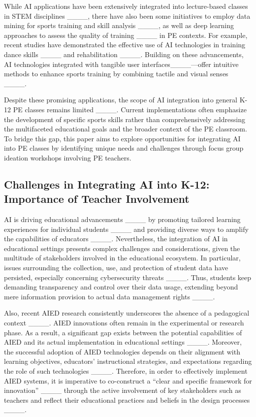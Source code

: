 While AI applications have been extensively integrated into lecture-based classes in STEM disciplines ____, there have also been some initiatives to employ data mining for sports training and skill analysis ____, as well as deep learning approaches to assess the quality of training ____ in PE contexts. For example, recent studies have demonstrated the effective use of AI technologies in training dance skills ____ and rehabilitation ____. Building on these advancements, AI technologies integrated with tangible user interfaces____—offer intuitive methods to enhance sports training by combining tactile and visual senses ____. 

Despite these promising applications, the scope of AI integration into general K-12 PE classes remains limited ____. Current implementations often emphasize the development of specific sports skills rather than comprehensively addressing the multifaceted educational goals and the broader context of the PE classroom. To bridge this gap, this paper aims to explore opportunities for integrating AI into PE classes by identifying unique needs and challenges through focus group ideation workshops involving PE teachers.


\subsection{Challenges in Integrating AI into K-12: Importance of Teacher Involvement}
AI is driving educational advancements ____ by promoting tailored learning experiences for individual students ____ and providing diverse ways to amplify the capabilities of educators ____. Nevertheless, the integration of AI in educational settings presents complex challenges and considerations, given the multitude of stakeholders involved in the educational ecosystem. In particular, issues surrounding the collection, use, and protection of student data have persisted, especially concerning cybersecurity threats  ____. Thus, students keep demanding transparency and control over their data usage, extending beyond mere information provision to actual data management rights ____.

Also, recent AIED research consistently underscores the absence of a pedagogical context ____. AIED innovations often remain in the experimental or research phase. As a result, a significant gap exists between the potential capabilities of AIED and its actual implementation in educational settings ____. Moreover, the successful adoption of AIED technologies depends on their alignment with learning objectives, educators' instructional strategies, and expectations regarding the role of such technologies ____. Therefore, in order to effectively implement AIED systems, it is imperative to co-construct a ``clear and specific framework for innovation'' ____ through the active involvement of key stakeholders such as teachers and reflect their educational practices and beliefs in the design processes ____.

